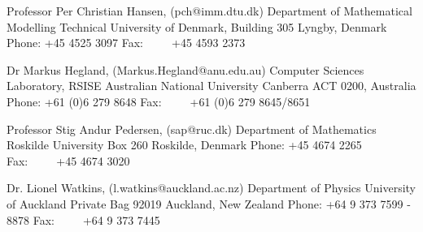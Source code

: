\documentclass[12pt,a4paper]{article}
\begin{document}
\noindent Professor Per Christian Hansen, (pch@imm.dtu.dk)\newline
Department of Mathematical Modelling \newline
Technical University of Denmark, Building 305  Lyngby, Denmark \newline
Phone: +45 4525 3097 \newline
Fax:\ \ \ \ \  +45 4593 2373\newline

\noindent Dr Markus Hegland, (Markus.Hegland@anu.edu.au)\newline
Computer Sciences Laboratory, RSISE \newline
Australian National University \newline
Canberra ACT 0200, Australia \newline
Phone: +61 (0)6 279 8648 \newline
Fax:\ \ \ \ \  +61 (0)6 279 8645/8651 \newline

\noindent Professor Stig Andur Pedersen, (sap@ruc.dk)\newline
Department of Mathematics\newline
Roskilde University\newline
Box 260 Roskilde, Denmark\newline
Phone: +45 4674 2265\newline
Fax:\ \ \ \ \  +45 4674 3020\newline

\noindent Dr. Lionel Watkins, (l.watkins@auckland.ac.nz)\newline
Department of Physics\newline
University of Auckland\newline
Private Bag 92019\newline
Auckland, New Zealand\newline
Phone: +64 9 373 7599 - 8878\newline
Fax:\ \ \ \ \  +64 9 373 7445\newline

\end{document}
